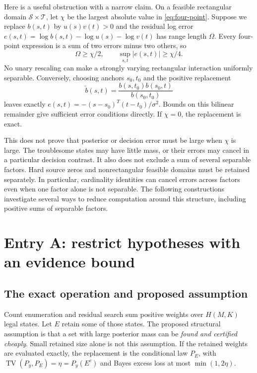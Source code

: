 \documentclass[10pt,a4paper]{article}
\newcommand{\TV}{\operatorname{TV}}
\begin{document}
Here is a useful obstruction with a narrow claim. On a feasible rectangular domain $\mathcal S\times\mathcal T$,
let $\chi$ be the largest absolute value in \eqref{eq:four-point}. Suppose we replace $b(s,t)$ by
$u(s)v(t)>0$ and the residual log error $e(s,t)=\log b(s,t)-\log u(s)-\log v(t)$ has range length $\Omega$.
Every four-point expression is a sum of two errors minus two others, so
\begin{equation}
 \Omega\geq\chi/2,\qquad \sup_{s,t}|e(s,t)|\geq\chi/4.
 \label{eq:rank-one-obstruction}
\end{equation}
No unary rescaling can make a strongly varying rectangular interaction uniformly separable. Conversely,
choosing anchors $s_0,t_0$ and the positive replacement
\[
 \widetilde b(s,t)=\frac{b(s,t_0)b(s_0,t)}{b(s_0,t_0)}
\]
leaves exactly $e(s,t)=-(s-s_0)^T(t-t_0)/\sigma^2$. Bounds on this bilinear remainder give sufficient error
conditions directly. If $\chi=0$, the replacement is exact.

This does not prove that posterior or decision error must be large when $\chi$ is large. The troublesome
states may have little mass, or their errors may cancel in a particular decision contrast. It also does not
exclude a sum of several separable factors. Hard source zeros and nonrectangular feasible domains must be
retained separately. In particular, cardinality identities can cancel errors across factors even when one
factor alone is not separable. The following constructions investigate several ways to reduce computation
around this structure, including positive sums of separable factors.

\section{Entry A: restrict hypotheses with an evidence bound}
\label{sec:entry-restriction}
\subsection{The exact operation and proposed assumption}
Count enumeration and residual search sum positive weights over $H(M,K)$ legal states. Let $E$ retain some
of those states. The proposed structural assumption is that a set with large posterior mass can be
\emph{found and certified cheaply}. Small retained size alone is not this assumption.
If the retained weights are evaluated exactly, the replacement is the conditional law $P_E$, with
$\TV(P_y,P_E)=\eta=P_y(E^c)$ and Bayes excess loss at most $\min(1,2\eta)$.
\end{document}
